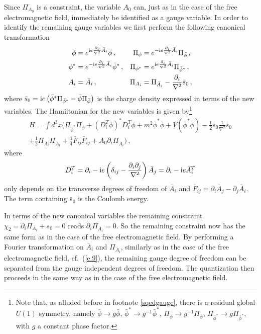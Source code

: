 \documentclass[12pt]{article}
\def\ii{\textrm i}
\begin{document}
Since $\Pi_{A_0}$ is a constraint, the variable $A_0$ can, just as in the case of the free electromagnetic field, immediately be identified as a gauge variable. In order to identify the remaining gauge variables we first perform the following canonical transformation 
\begin{align}
\phi &= e^{\ii e \frac{\partial_i}{\nabla^2} {\bar A}_i}  {\bar \phi}\,, & \Pi_{\phi} &= e^{-\ii e \frac{\partial_i}{\nabla^2} {\bar A}_i} \Pi_{{\bar \phi}}\,, \nonumber\\
\phi^* &= e^{-\ii e \frac{\partial_i}{\nabla^2} {\bar A}_i}  {\bar \phi}^*\,, & \Pi_{\phi^*} &= e^{\ii e \frac{\partial_i}{\nabla^2} {\bar A}_i} \Pi_{{\bar \phi}^*}\,, \nonumber\\
A_i &= {\bar A}_i\,, & \Pi_{A_i} &= \Pi_{{\bar A}_i} - \frac{\partial_i}{\nabla^2} {\bar s}_0\,,
\label{sq.9}
\end{align}
where ${\bar s}_0 = \ii e\left({\bar \phi}^*   \Pi_{{\bar \phi}^*} - {\bar \phi}  \Pi_{{\bar \phi} } \right)$ is the charge density expressed in terms of the new variables. The Hamiltonian for the new variables is given by{\footnote{Note that, as alluded before in footnote \ref{sqedgauge}, there is a residual global $U(1)$ symmetry, namely ${\bar \phi} \to g{\bar \phi}$, ${\bar \phi}^* \to g^{-1}{\bar \phi}^*$, $\Pi_{{\bar \phi}} \to g^{-1}\Pi_{{\bar \phi}}$, $\Pi_{{\bar \phi}^*} \to g\Pi_{{\bar \phi}^*}$, with $g$ a constant phase factor.}}
\begin{multline}
H = \int d^3 x \bigg(\Pi_{{\bar \phi}^*} \Pi_{{\bar \phi}} + \left(D^T_{i} {\bar \phi}  \right)^{*}  D^T_{i} {\bar \phi}  + m^2 {\bar \phi}^* {\bar \phi} +  V({\bar \phi}^*{\bar \phi}) -\frac{1}{2} {\bar s}_0  \frac{1}{\nabla^2} {\bar s}_0   \\
 +  \frac{1}{2} \Pi_{{\bar A}_i}\Pi_{{\bar A}_i} +  \frac{1}{4} {\bar F}_{ij}{\bar F}_{ij}  + A_0  \partial_i \Pi_{{\bar A}_i}\bigg)\,, \label{108}
\end{multline}
where 
\begin{equation}
D^T_{i} = \partial_{i} - \ii e\left(\delta_{ij} - \frac{\partial_i \partial_j}{\nabla^2} \right) {\bar A}_j =  \partial_{i} - \ii e{\bar A}^T_i
\label{sq.10}
\end{equation}
only depends on the transverse degrees of freedom of ${\bar A}_i$ and ${\bar F}_{ij} = \partial_i {\bar A}_j - \partial_j {\bar A}_i$. The term containing ${\bar s}_0$ is the Coulomb energy.

In terms of the new canonical variables the remaining constraint $\chi_{2} = \partial_i \Pi_{A_i} + s_0 =0$ reads $\partial_i \Pi_{{\bar A}_i}=0$. So the remaining constraint now has the same form as in the case of the free electromagnetic field. By performing a Fourier transformation on ${\bar A}_i$ and $\Pi_{{\bar A}_i}$, similarly as in the case of the free electromagnetic field, cf.\ (\ref{e.9}), the remaining gauge degree of freedom can be separated from the gauge independent degrees of freedom. The quantization then proceeds in the same way as in the case of the free electromagnetic field. 
\end{document}
